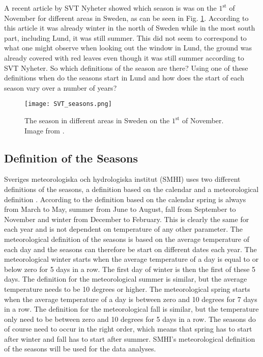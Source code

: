 

A recent article by SVT Nyheter showed which season is was on the $1^\text{st}$ of November for different areas in Sweden, as can be seen in Fig. \ref{fig:SVT}. According to this article it was already winter in the north of Sweden while in the most south part, including Lund, it was still summer. This did not seem to correspond to what one might observe when looking out the window in Lund, the ground was already covered with red leaves even though it was still summer according to SVT Nyheter. So which definitions of the season are there? Using one of these definitions when do the seasons start in Lund and how does the start of each season vary over a number of years?

\begin{figure}[h!]
\centering
\texttt{[image: SVT\_seasons.png]}
\caption{The season in different areas in Sweden on the $1^\text{st}$ of November. Image from \cite{SVT}.}
\label{fig:SVT}
\end{figure}

\subsection{Definition of the Seasons}

Sveriges meteorologiska och hydrologiska institut (SMHI) uses two different definitions of the seasons, a definition based on the calendar and a meteorological definition \cite{SMHI}. According to the definition based on the calendar spring is always from March to May, summer from June to August, fall from September to November and winter from December to February. This is clearly the same for each year and is not dependent on temperature of any other parameter. The meteorological definition of the seasons is based on the average temperature of each day and the seasons can therefore be start on different dates each year. The meteorological winter starts when the average temperature of a day is equal to or below zero for 5 days in a row. The first day of winter is then the first of these 5 days.  The definition for the meteorological summer is similar, but the average temperature needs to be 10 degrees or higher. The meteorological spring starts when the average temperature of a day is between zero and 10 degrees for 7 days in a row. The definition for the meteorological fall is similar, but the temperature only need to be between zero and 10 degrees for 5 days in a row. The seasons do of course need to occur in the right order, which means that spring has to start after winter and fall has to start after summer. SMHI's meteorological definition of the seasons will be used for the data analyses. 

